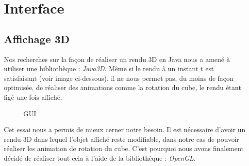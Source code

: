 \chapter{Interface}
\section{Affichage 3D}
Nos recherches sur la façon de réaliser un rendu 3D en Java nous a amené à utiliser une bibliothèque : \textit{Java3D}\cite{cite5}.
Même si le rendu à un instant t est satisfaisant (voir image ci-dessous), il ne nous permet pas, du moins de façon optimisée, de réaliser des animations comme la rotation du cube, le rendu étant figé une fois affiché.
\begin{figure}[h]
\begin{center}
\end{center}
\caption{GUI}
\end{figure}
Cet essai nous a permis de mieux cerner notre besoin. 
Il est nécessaire d'avoir un rendu 3D dans lequel l'objet affiché reste modifiable, dans notre cas de pouvoir réaliser les animation de rotation du cube. C'est pourquoi nous avons finalement décidé de réaliser tout cela à l'aide de la bibliothèque : \textit{OpenGL}\cite{cite6}.

